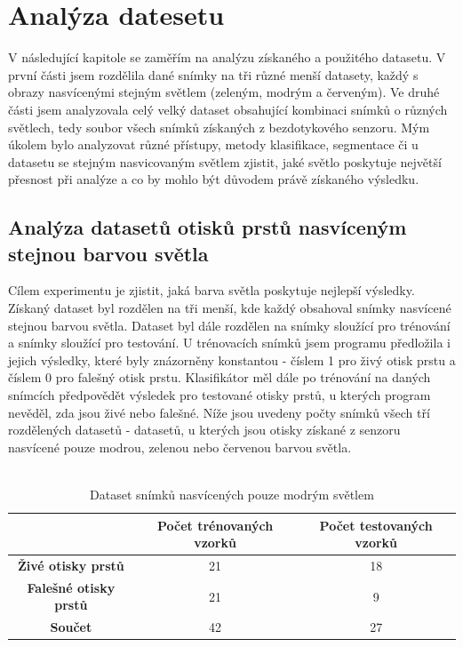 \section{Analýza datesetu}
V následující kapitole se zaměřím na analýzu získaného a použitého datasetu. V první části jsem rozdělila dané snímky na tři různé menší datasety, každý s obrazy nasvícenými stejným světlem (zeleným, modrým a červeným). Ve druhé části jsem analyzovala celý velký dataset obsahující kombinaci snímků o různých světlech, tedy soubor všech snímků získaných z bezdotykového senzoru. Mým úkolem bylo analyzovat různé přístupy, metody klasifikace, segmentace či u datasetu se stejným nasvicovaným světlem zjistit, jaké světlo poskytuje největší přesnost při analýze a co by mohlo být důvodem právě získaného výsledku.

\subsection{Analýza datasetů otisků prstů nasvíceným stejnou barvou světla}
Cílem experimentu je zjistit, jaká barva světla poskytuje nejlepší výsledky. Získaný dataset byl rozdělen na tři menší, kde každý obsahoval snímky nasvícené stejnou barvou světla. Dataset byl dále rozdělen na snímky sloužící pro trénování a snímky sloužící pro testování. U trénovacích snímků jsem programu předložila i jejich výsledky, které byly znázorněny konstantou - číslem 1 pro živý otisk prstu a číslem 0 pro falešný otisk prstu. Klasifikátor měl dále po trénování na daných snímcích předpovědět výsledek pro testované otisky prstů, u kterých program nevěděl, zda jsou živé nebo falešné. Níže jsou uvedeny počty snímků všech tří rozdělených datasetů - datasetů, u kterých jsou otisky získané z senzoru nasvícené pouze modrou, zelenou nebo červenou barvou světla. \\\

\capstartfalse
\begin{table}[!htbp]
\centering
\begin{tabular}{|c|c|c|}
\hline
\textbf{}                     & \textbf{Počet trénovaných vzorků} & \textbf{Počet testovaných vzorků} \\ \hline
\textbf{Živé otisky prstů}    & 21                                & 18                                \\ \hline
\textbf{Falešné otisky prstů} & 21                                & 9                                \\ \hline
\textbf{Součet}               & 42                                & 27                                \\ \hline
\end{tabular}
\caption{Dataset snímků nasvícených pouze modrým světlem}
\end{table}
\capstarttrue


